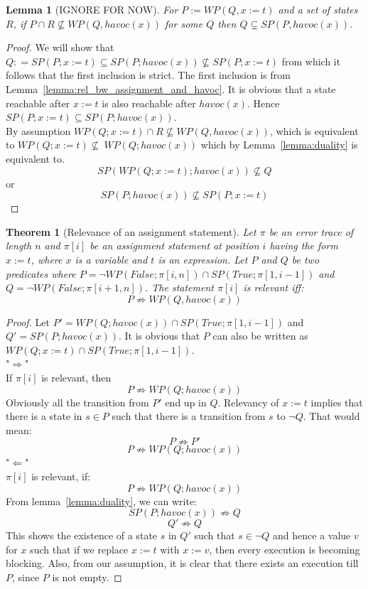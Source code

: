\documentclass{article}
\newcommand{\limp}{\Rightarrow}
\newcommand{\WP}[2]{\mathit{WP}(#1,#2)}
\newcommand{\SP}[2]{\mathit{SP}(#1,#2)}
\newcommand{\havoc}{\mathit{havoc}}
\newtheorem{theorem}{Theorem}
\newtheorem{lemma}{Lemma}
\begin{document}
\begin{lemma}[IGNORE FOR NOW]\label{lemma:nonempty_post}
	For $P := \WP{Q}{x := t}$ and a set of states $R$, if $ P \cap R \nsubseteq \WP{Q}{\havoc(x)}$ for some $Q$ then $Q \subsetneq \SP{P}{\havoc(x)}$.
\end{lemma}
\begin{proof}
	We will show that $Q : =SP(P; x:=t) \subseteq SP(P;havoc(x)) \not\subseteq SP(P; x:=t)$ from which it follows that the first inclusion is strict.
	The first inclusion is from Lemma~\ref{lemma:rel_bw_assignment_and_havoc}. It is obvious that a state reachable after $x:=t$ is also reachable 
	after $havoc(x)$. Hence $SP(P; x:=t) \subseteq SP(P;havoc(x))$. \\
	By assumption $WP(Q;x:=t) \cap R \not\subseteq \WP{Q}{\havoc(x)}$, which is equivalent to $WP(Q; x:=t) \not \subseteq \ WP(Q; havoc(x))$ which by Lemma~\ref{lemma:duality} is equivalent to.
	$$SP(WP(Q;x:=t); havoc(x)) \not\subseteq Q$$
	or 
	$$SP(P;havoc(x)) \not\subseteq SP(P; x:=t)$$
\end{proof}

\begin{theorem}[Relevance of an assignment statement]\label{mydef:relevancytheorem}
Let $\pi$ be an error trace of length $n$ and $\pi[i]$ be an assignment statement at position $i$ having the form $x:=t$, where $x$ is a variable and $t$ is an expression. Let $P$ and $Q$ be two predicates where $P = \neg WP(False; \pi[i,n]) \cap SP(True; \pi[1,i-1])$ and $Q =  \neg WP(False; \pi[i+1,n])$. The statement $\pi[i]$ is relevant iff:
 $$P \not \limp WP(Q,havoc(x))$$
\end{theorem}

\begin{proof}
Let $P' = WP(Q;havoc(x)) \cap SP(True; \pi[1,i-1])$ and $Q'=SP(P;havoc(x))$. It is obvious that $P$ can also be written as $WP(Q;x:=t) \cap SP(True; \pi[1,i-1])$.\\
"$\Rightarrow$"\\
If $\pi[i]$ is relevant, then\\
$$P \not \limp WP(Q;havoc(x))$$
Obviously all the transition from $P'$ end up in $Q$. Relevancy of $x:=t$ implies that there is a state in $s \in P$ such that there is a transition from $s$ to $\neg Q$. That would mean:
$$P \not \limp P'$$
$$P \not \limp WP(Q;havoc(x))$$
"$\Leftarrow$"\\
$\pi[i]$ is relevant, if:
$$P \not \limp WP(Q;havoc(x))$$
From lemma~\ref{lemma:duality}, we can write:
$$SP(P; havoc(x)) \not \limp Q$$
$$Q' \not \limp Q$$
This shows the existence of a state $s$ in $Q'$ such that $s\in \neg Q$ and hence a value $v$ for $x$ such that if we replace $x:=t$ with $x:=v$, then every execution is becoming blocking. Also, from our assumption, it is clear that there exists an execution till $P$, since $P$ is not empty.


\end{proof}
\end{document}
